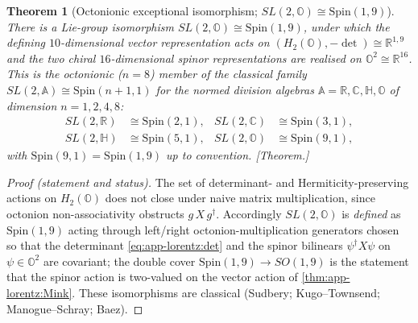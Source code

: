 \documentclass[11pt]{article}
\theoremstyle{plain}
\newtheorem{theorem}{Theorem}[section]
\theoremstyle{definition}
\theoremstyle{remark}
\begin{document}
\begin{theorem}[Octonionic exceptional isomorphism; \texorpdfstring{$SL(2,\mathbb{O})\cong\mathrm{Spin}(1,9)$}{SL(2,O)=Spin(1,9)}]
\label{thm:app-lorentz:SL2O}
There is a Lie-group isomorphism $SL(2,\mathbb{O})\cong\mathrm{Spin}(1,9)$, under
which the defining $10$-dimensional vector representation acts on
$(H_{2}(\mathbb{O}),-\det)\cong\mathbb{R}^{1,9}$ and the two chiral
$16$-dimensional spinor representations are realised on
$\mathbb{O}^{2}\cong\mathbb{R}^{16}$. This is the octonionic ($n=8$) member of the
classical family $SL(2,\mathbb{A})\cong\mathrm{Spin}(n+1,1)$ for the normed
division algebras $\mathbb{A}=\mathbb{R},\mathbb{C},\mathbb{H},\mathbb{O}$ of
dimension $n=1,2,4,8$:
\begin{equation}
\label{eq:app-lorentz:family}
\begin{aligned}
SL(2,\mathbb{R}) &\cong \mathrm{Spin}(2,1), &
SL(2,\mathbb{C}) &\cong \mathrm{Spin}(3,1), \\
SL(2,\mathbb{H}) &\cong \mathrm{Spin}(5,1), &
SL(2,\mathbb{O}) &\cong \mathrm{Spin}(9,1),
\end{aligned}
\end{equation}
with $\mathrm{Spin}(9,1)=\mathrm{Spin}(1,9)$ up to convention. \emph{[Theorem.]}
\end{theorem}

\begin{proof}[Proof (statement and status)]
The set of determinant- and Hermiticity-preserving actions on
$H_{2}(\mathbb{O})$ does not close under naive matrix multiplication, since
octonion non-associativity obstructs $g\,X\,g^{\dagger}$. Accordingly
$SL(2,\mathbb{O})$ is \emph{defined} as $\mathrm{Spin}(1,9)$ acting through
left/right octonion-multiplication generators chosen so that the determinant
\eqref{eq:app-lorentz:det} and the spinor bilinears $\psi^{\dagger}X\psi$ on
$\psi\in\mathbb{O}^{2}$ are covariant; the double cover
$\mathrm{Spin}(1,9)\to SO(1,9)$ is the statement that the spinor action is
two-valued on the vector action of \autoref{thm:app-lorentz:Mink}. These
isomorphisms are classical (Sudbery; Kugo--Townsend; Manogue--Schray; Baez).
\end{proof}
\end{document}
